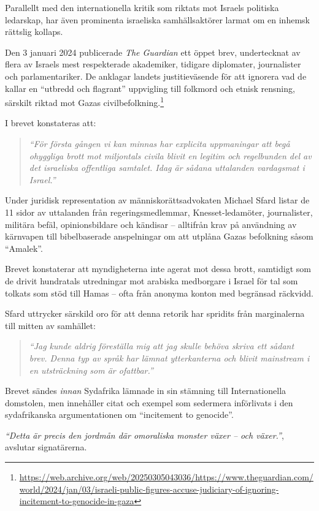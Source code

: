 \documentclass[12pt]{article}
\begin{document}
Parallellt med den internationella kritik som riktats mot Israels politiska ledarskap, har även prominenta israeliska samhällsaktörer larmat om en inhemsk rättslig kollaps.

Den 3 januari 2024 publicerade \textit{The Guardian} ett öppet brev, undertecknat av flera av Israels mest respekterade akademiker, tidigare diplomater, journalister och parlamentariker. De anklagar landets justitieväsende för att ignorera vad de kallar en “utbredd och flagrant” uppvigling till folkmord och etnisk rensning, särskilt riktad mot Gazas civilbefolkning.\footnote{\url{https://web.archive.org/web/20250305043036/https://www.theguardian.com/world/2024/jan/03/israeli-public-figures-accuse-judiciary-of-ignoring-incitement-to-genocide-in-gaza}}

I brevet konstateras att:
\begin{quote}
\textit{“För första gången vi kan minnas har explicita uppmaningar att begå ohyggliga brott mot miljontals civila blivit en legitim och regelbunden del av det israeliska offentliga samtalet. Idag är sådana uttalanden vardagsmat i Israel.”}
\end{quote}

Under juridisk representation av människorättsadvokaten Michael Sfard listar de 11 sidor av uttalanden från regeringsmedlemmar, Knesset-ledamöter, journalister, militära befäl, opinionsbildare och kändisar – alltifrån krav på användning av kärnvapen till bibelbaserade anspelningar om att utplåna Gazas befolkning såsom “Amalek”.

Brevet konstaterar att myndigheterna inte agerat mot dessa brott, samtidigt som de drivit hundratals utredningar mot arabiska medborgare i Israel för tal som tolkats som stöd till Hamas – ofta från anonyma konton med begränsad räckvidd.

Sfard uttrycker särskild oro för att denna retorik har spridits från marginalerna till mitten av samhället:
\begin{quote}
\textit{“Jag kunde aldrig föreställa mig att jag skulle behöva skriva ett sådant brev. Denna typ av språk har lämnat ytterkanterna och blivit mainstream i en utsträckning som är ofattbar.”}
\end{quote}

Brevet sändes \textit{innan} Sydafrika lämnade in sin stämning till Internationella domstolen, men innehåller citat och exempel som sedermera införlivats i den sydafrikanska argumentationen om “incitement to genocide”.

\textit{“Detta är precis den jordmån där omoraliska monster växer – och växer.”}, avslutar signatärerna.
\end{document}

